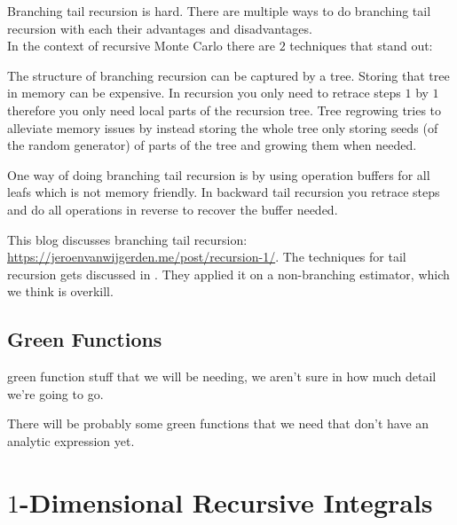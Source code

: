 \documentclass[a4paper,12pt]{article}
\begin{document}
Branching tail recursion is hard. There  are multiple ways to
do branching tail recursion with each their advantages and disadvantages. \\
In the context of recursive Monte Carlo there are $2$ techniques that
stand out:

\begin{technique}
    The structure of branching recursion can be captured by a tree. Storing that tree
    in memory can be expensive. In recursion you only need to retrace steps
    $1$ by $1$ therefore you only need local parts of the recursion tree. Tree
    regrowing tries to alleviate memory issues by instead storing the whole
    tree only storing seeds (of the random generator) of parts of the
    tree and growing them when needed.
\end{technique}

\begin{technique}
    One way of doing branching tail recursion is by using operation buffers for
    all leafs which is not memory friendly. In backward tail recursion you retrace
    steps and do all operations in reverse to recover the buffer needed.
\end{technique}


\begin{related}
    This blog discusses branching tail recursion:
    \url{https://jeroenvanwijgerden.me/post/recursion-1/}.
    The techniques for tail recursion  gets discussed in \cite{vicini_path_2021}.
    They applied it on a non-branching estimator, which we think is overkill.
\end{related}

\subsection{Green Functions}
green function stuff that we will be needing, we aren't sure in how much detail we're going to go.

\begin{example}
    There will be probably some green functions that we need
    that don't have an analytic expression yet.
\end{example}

\section{$1$-Dimensional Recursive Integrals}
\end{document}
